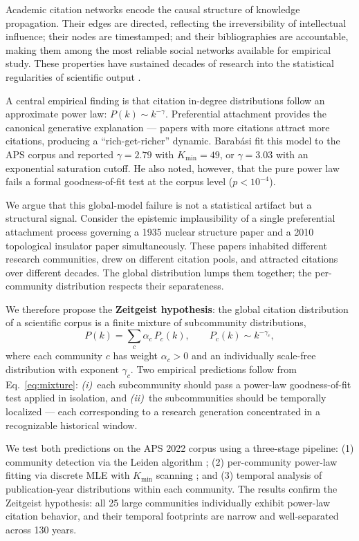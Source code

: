 \documentclass[runningheads]{llncs}
\begin{document}
Academic citation networks encode the causal structure of knowledge propagation.
Their edges are directed, reflecting the irreversibility of intellectual
influence; their nodes are timestamped; and their bibliographies are
accountable, making them among the most reliable social networks available for
empirical study.  These properties have sustained decades of research into
the statistical regularities of scientific output
\cite{Price1965,Price1976,Redner1998,Newman2003}.

A central empirical finding is that citation in-degree distributions follow an
approximate power law: $P(k) \sim k^{-\gamma}$.  Preferential attachment
\cite{Price1976} provides the canonical generative explanation --- papers with
more citations attract more citations, producing a ``rich-get-richer'' dynamic.
Barab{\'a}si \cite{Barabasi2016} fit this model to the APS corpus and reported
$\gamma = 2.79$ with $K_{\min} = 49$, or $\gamma = 3.03$ with an exponential
saturation cutoff.  He also noted, however, that the pure power law fails a
formal goodness-of-fit test at the corpus level ($p < 10^{-4}$).

We argue that this global-model failure is not a statistical artifact but
a structural signal.  Consider the epistemic implausibility of a single
preferential attachment process governing a 1935 nuclear structure paper and a
2010 topological insulator paper simultaneously.  These papers inhabited
different research communities, drew on different citation pools, and attracted
citations over different decades.  The global distribution lumps them together;
the per-community distribution respects their separateness.

We therefore propose the \textbf{Zeitgeist hypothesis}: the global citation
distribution of a scientific corpus is a finite mixture of subcommunity
distributions,
\begin{equation}
  P(k) = \sum_{c} \alpha_c\, P_c(k), \qquad P_c(k) \sim k^{-\gamma_c},
  \label{eq:mixture}
\end{equation}
where each community $c$ has weight $\alpha_c > 0$ and an individually
scale-free distribution with exponent $\gamma_c$.  Two empirical predictions
follow from Eq.~\eqref{eq:mixture}: \emph{(i)}~each subcommunity should pass a
power-law goodness-of-fit test applied in isolation, and \emph{(ii)}~the
subcommunities should be temporally localized --- each corresponding to a
research generation concentrated in a recognizable historical window.

We test both predictions on the APS 2022 corpus using a three-stage pipeline:
(1) community detection via the Leiden algorithm \cite{Traag2019}; (2)
per-community power-law fitting via discrete MLE with $K_{\min}$ scanning
\cite{Clauset2009}; and (3) temporal analysis of publication-year distributions
within each community.  The results confirm the Zeitgeist hypothesis: all 25
large communities individually exhibit power-law citation behavior, and their
temporal footprints are narrow and well-separated across 130 years.
\end{document}
